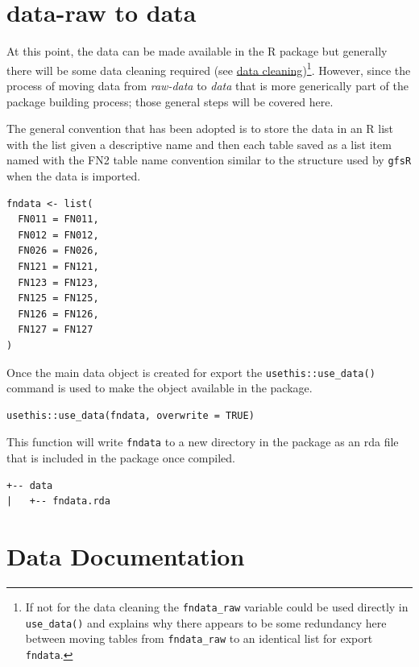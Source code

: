 \documentclass[
]{book}
\begin{document}
\hypertarget{data-raw-to-data}{%
\section{data-raw to data}\label{data-raw-to-data}}

At this point, the data can be made available in the R package but generally there will be some data cleaning required (see \href{data-cleaning.html}{data cleaning})\footnote{If not for the data cleaning the \texttt{fndata\_raw} variable could be used directly in \texttt{use\_data()} and explains why there appears to be some redundancy here between moving tables from \texttt{fndata\_raw} to an identical list for export \texttt{fndata}.}. However, since the process of moving data from \emph{raw-data} to \emph{data} that is more generically part of the package building process; those general steps will be covered here.

The general convention that has been adopted is to store the data in an R list with the list given a descriptive name and then each table saved as a list item named with the FN2 table name convention similar to the structure used by \texttt{gfsR} when the data is imported.

\begin{verbatim}
fndata <- list(
  FN011 = FN011,
  FN012 = FN012,
  FN026 = FN026,
  FN121 = FN121,
  FN123 = FN123,
  FN125 = FN125,
  FN126 = FN126,
  FN127 = FN127
)
\end{verbatim}

Once the main data object is created for export the \texttt{usethis::use\_data()} command is used to make the object available in the package.

\begin{verbatim}
usethis::use_data(fndata, overwrite = TRUE)
\end{verbatim}

This function will write \texttt{fndata} to a new directory in the package as an rda file that is included in the package once compiled.

\begin{verbatim}
+-- data
|   +-- fndata.rda
\end{verbatim}

\hypertarget{data-documentation}{%
\section{Data Documentation}\label{data-documentation}}
\end{document}
